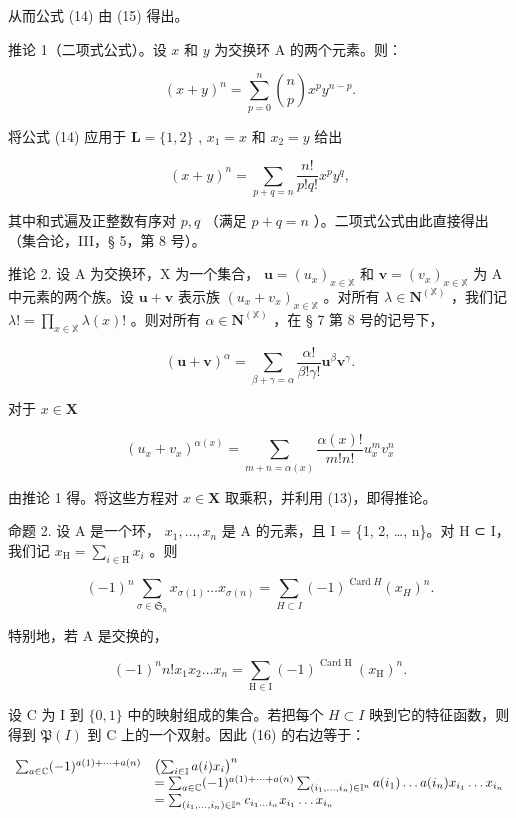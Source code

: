 从而公式 (14) 由 (15) 得出。

推论 1（二项式公式）。设 \(x\) 和 \(y\) 为交换环 A 的两个元素。则：

\[
(x + y) ^ {n} = \sum_ {p = 0} ^ {n} \binom {n} {p} x ^ {p} y ^ {n - p}.
\]

将公式 (14) 应用于 \(\mathbf{L} = \{1,2\}\) , \(x_{1} = x\) 和 \(x_{2} = y\) 给出

\[
(x + y) ^ {n} = \sum_ {p + q = n} \frac {n !}{p ! q !} x ^ {p} y ^ {q},
\]

其中和式遍及正整数有序对 \(p, q\) （满足 \(p + q = n\) ）。二项式公式由此直接得出（集合论，III，§ 5，第 8 号）。

推论 2. 设 A 为交换环，X 为一个集合， \(\mathbf{u} = (u_x)_{x \in \mathbb{X}}\) 和 \(\mathbf{v} = (v_x)_{x \in \mathbb{X}}\) 为 A 中元素的两个族。设 \(\mathbf{u} + \mathbf{v}\) 表示族 \((u_x + v_x)_{x \in \mathbb{X}}\) 。对所有 \(\lambda \in \mathbf{N}^{(\mathbb{X})}\) ，我们记 \(\lambda! = \prod_{x \in \mathbb{X}} \lambda(x)!\) 。则对所有 \(\alpha \in \mathbf{N}^{(\mathbb{X})}\) ，在 § 7 第 8 号的记号下，

\[
(\mathbf {u} + \mathbf {v}) ^ {\alpha} = \sum_ {\beta + \gamma = \alpha} \frac {\alpha !}{\beta ! \gamma !} \mathbf {u} ^ {\beta} \mathbf {v} ^ {\gamma}.
\]

对于 \(x\in \mathbf{X}\)

\[
(u _ {x} + v _ {x}) ^ {\alpha (x)} = \sum_ {m + n = \alpha (x)} \frac {\alpha (x) !}{m ! n !} u _ {x} ^ {m} v _ {x} ^ {n}
\]

由推论 1 得。将这些方程对 \(x \in \mathbf{X}\) 取乘积，并利用 (13)，即得推论。

命题 2. 设 A 是一个环， \(x_{1}, \ldots, x_{n}\) 是 A 的元素，且 I = \{1, 2, \ldots, n\}。对 H ⊂ I，我们记 \(x_{\mathrm{H}} = \sum_{i \in \mathrm{H}} x_{i}\) 。则

\[
(- 1) ^ {n} \sum_ {\sigma \in \mathfrak {S} _ {n}} x _ {\sigma (1)} \dots x _ {\sigma (n)} = \sum_ {H \subset I} (- 1) ^ {\operatorname{Card} H} (x _ {H}) ^ {n}.\tag{16}
\]

特别地，若 A 是交换的，

\[
(- 1) ^ {n} n! x _ {1} x _ {2} \dots x _ {n} = \sum_ {\mathrm{H} \in \mathrm{I}} (- 1) ^ {\text { Card   H }} (x _ {\mathrm{H}}) ^ {n}.
\]

设 C 为 I 到 \(\{0,1\}\) 中的映射组成的集合。若把每个 \(H \subset I\) 映到它的特征函数，则得到 \(\mathfrak{P}(I)\) 到 C 上的一个双射。因此 (16) 的右边等于：

\[
\begin{array}{r l} \sum_ {a \in \mathbb {C}} (- 1) ^ {a (1) + \dots + a (n)} & \left(\sum_ {i \in \mathbb {I}} a (i) x _ {i}\right) ^ {n} \\ & = \sum_ {a \in \mathbb {C}} (- 1) ^ {a (1) + \dots + a (n)} \sum_ {(i _ {1}, \ldots , i _ {n}) \in \mathbb {I} ^ {n}} a (i _ {1}) \ldots a (i _ {n}) x _ {i _ {1}} \ldots x _ {i _ {n}} \\ & = \sum_ {(i _ {1}, \ldots , i _ {n}) \in \mathbb {I} ^ {n}} c _ {i _ {1} \ldots i _ {n}} x _ {i _ {1}} \ldots x _ {i _ {n}} \end{array}
\]

